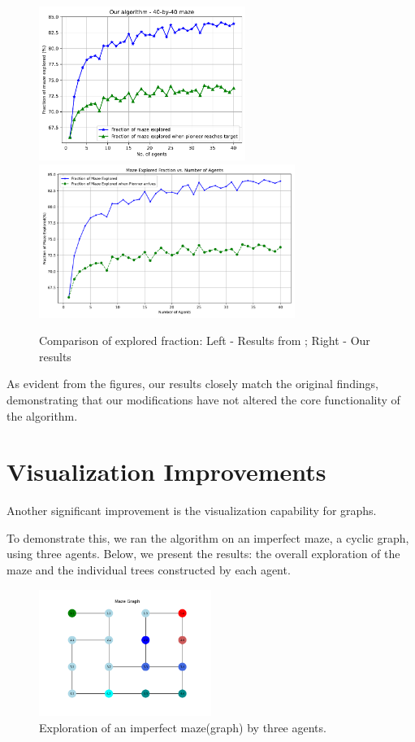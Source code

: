 \begin{figure}[H]
    \centering
    \includegraphics[height=5cm]{Cap3/arthur_40x40_fraction.pdf}
    \includegraphics[height=5cm]{Cap3/self_fraction_40x40.pdf}
    \caption{Comparison of explored fraction: Left - Results from ; Right - Our results}
\label{fig_comparison_fraction}
\end{figure}

As evident from the figures, our results closely match the original findings,
demonstrating that our modifications have not altered the core functionality of the algorithm.

\section{Visualization Improvements}
\label{section_result_visualization}

Another significant improvement is the visualization capability for graphs.

To demonstrate this, we ran the algorithm on an imperfect maze, a cyclic graph, using three agents.
Below, we present the results: the overall exploration of the maze and the individual trees constructed by each agent.

\begin{figure}[H]
\centering
\includegraphics[width=0.5\textwidth]{Cap3/maze_imperfect_exploration.png}
\caption{Exploration of an imperfect maze(graph) by three agents.}
\label{fig_imperfect_maze_exploration}
\end{figure}
    
